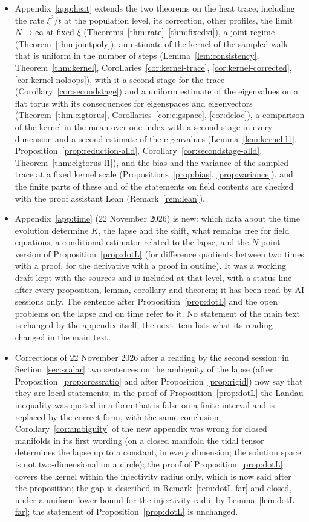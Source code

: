 \documentclass[11pt,a4paper]{article}
\theoremstyle{stmt}
\theoremstyle{defn}
\theoremstyle{rmk}
\numberwithin{equation}{section}
\begin{document}
\begin{itemize}
\item Appendix~\ref{app:heat} extends the two theorems on the heat trace, including the rate $\xi^2/t$ at the population level, its correction, other profiles, the limit $N\to\infty$ at fixed $\xi$ (Theorems~\ref{thm:rate}--\ref{thm:fixedxi}), a joint regime (Theorem~\ref{thm:jointpoly}), an estimate of the kernel of the sampled walk that is uniform in the number of steps (Lemma~\ref{lem:consistency}, Theorem~\ref{thm:kernel}, Corollaries~\ref{cor:kernel-trace}, \ref{cor:kernel-corrected}, \ref{cor:kernel-noloops}), with it a second stage for the trace (Corollary~\ref{cor:secondstage}) and a uniform estimate of the eigenvalues on a flat torus with its consequences for eigenspaces and eigenvectors (Theorem~\ref{thm:eigtorus}, Corollaries~\ref{cor:eigspace}, \ref{cor:deloc}), a comparison of the kernel in the mean over one index with a second stage in every dimension and a second estimate of the eigenvalues (Lemma~\ref{lem:kernel-l1}, Proposition~\ref{prop:reduction-alld}, Corollary~\ref{cor:secondstage-alld}, Theorem~\ref{thm:eigtorus-l1}), and the bias and the variance of the sampled trace at a fixed kernel scale (Propositions~\ref{prop:bias}, \ref{prop:variance}), and the finite parts of these and of the statements on field contents are checked with the proof assistant Lean (Remark~\ref{rem:lean}).
\item Appendix~\ref{app:time} (22 November 2026) is new: which data about the time evolution determine $K$, the lapse and the shift, what remains free for field equations, a conditional estimator related to the lapse, and the $N$-point version of Proposition~\ref{prop:dotL} (for difference quotients between two times with a proof, for the derivative with a proof in outline). It was a working draft kept with the sources and is included at that level, with a status line after every proposition, lemma, corollary and theorem; it has been read by AI sessions only. The sentence after Proposition~\ref{prop:dotL} and the open problems on the lapse and on time refer to it. No statement of the main text is changed by the appendix itself; the next item lists what its reading changed in the main text.
\item Corrections of 22 November 2026 after a reading by the second session: in Section~\ref{sec:scalar} two sentences on the ambiguity of the lapse (after Proposition~\ref{prop:crossratio} and after Proposition~\ref{prop:rigid}) now say that they are local statements; in the proof of Proposition~\ref{prop:dotL} the Landau inequality was quoted in a form that is false on a finite interval and is replaced by the correct form, with the same conclusion; Corollary~\ref{cor:ambiguity} of the new appendix was wrong for closed manifolds in its first wording (on a closed manifold the tidal tensor determines the lapse up to a constant, in every dimension; the solution space is not two-dimensional on a circle); the proof of Proposition~\ref{prop:dotL} covers the kernel within the injectivity radius only, which is now said after the proposition; the gap is described in Remark~\ref{rem:dotL-far} and closed, under a uniform lower bound for the injectivity radii, by Lemma~\ref{lem:dotL-far}; the statement of Proposition~\ref{prop:dotL} is unchanged.

\end{itemize}
\end{document}
